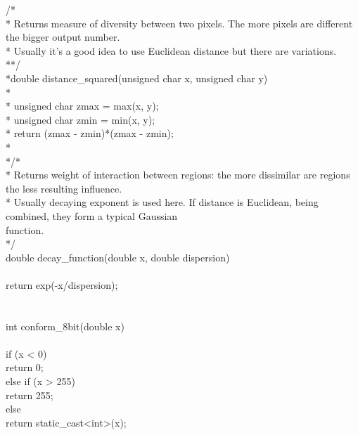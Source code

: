 \documentclass[a4paper,12pt]{article}
\begin{document}
/*
\\*	Returns measure of diversity between two pixels. The more pixels are different the bigger output number.
\\*	Usually it's a good idea to use Euclidean distance but there are variations.
\\**/
\\*double distance\_squared(unsigned char x, unsigned char y)
\\*{
\\*	unsigned char zmax = max(x, y);
\\*	unsigned char zmin = min(x, y);
\\*   return (zmax - zmin)*(zmax - zmin);
\\*}
\\*/*
\\*    Returns weight of interaction between regions: the more dissimilar are regions the less resulting influence.
\\*    Usually decaying exponent is used here. If distance is Euclidean, being combined, they form a typical Gaussian \\function.
\\*/
\\double decay\_function(double x, double dispersion)
\\{
\\	return exp(-x/dispersion);
\\}
\\
\\int conform\_8bit(double x)
\\{
\\	if (x < 0)
\\		return 0;
\\	else if (x > 255)
\\		return 255;
\\	else
\\		return static\_cast<int>(x);
\\}
\end{document}
